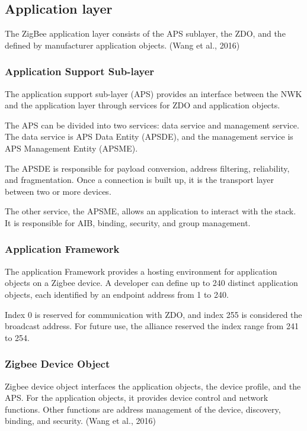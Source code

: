 \subsection{Application layer}

The ZigBee application layer consists of the APS sublayer, the ZDO, and the deﬁned by manufacturer application objects. (Wang et al., 2016)
\cite{nxp:2016}

\subsubsection{Application Support Sub-layer}

The application support sub-layer (APS) provides an interface between the NWK and the application layer through services for ZDO and application objects. 

The APS can be divided into two services: data service and management service. The data service is APS Data Entity (APSDE), and the management service is APS Management Entity (APSME).

The APSDE is responsible for payload conversion, address filtering, reliability, and fragmentation. Once a connection is built up, it is the transport layer between two or more devices.

The other service, the APSME, allows an application to interact with the stack. It is responsible for AIB, binding, security, and group management.


\subsubsection{Application Framework}

The application Framework provides a hosting environment for application objects on a Zigbee device.
A developer can define up to 240 distinct application objects, each identified by an endpoint address from 1 to 240. 

Index 0 is reserved for communication with ZDO, and index 255 is considered the broadcast address.
For future use, the alliance reserved the index range from 241 to 254.

\subsubsection{Zigbee Device Object}
Zigbee device object interfaces the application objects, the device profile, and the APS. For the application objects, it provides device control and network functions. Other functions are address management of the device, discovery, binding, and security. (Wang et al., 2016)

